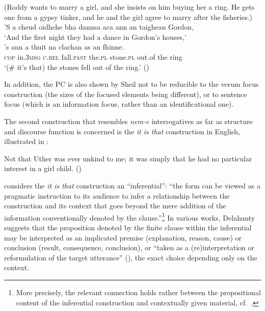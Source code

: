 \documentclass[output=paper,colorlinks,citecolor=brown]{langscibook}
\begin{document}
	
	\ea\label{ex:SG}
	(Roddy wants to marry a girl, and she insists on him buying her a ring. He gets
	one from a gypsy tinker, and he and the girl agree to marry after the fisheries.)\\
	'S a cheud oidhche bha dannsa aca ann an taighean Gordon,\\
	`And the first night they had a dance in Gordon's houses,'\\
	\gll 's ann a thuit na clachan as an fhinne.\\
	\textsc{cop} in.3\textsc{msg} \textsc{c.rel} fall.\textsc{past} 
	the.\textsc{pl}  stone.\textsc{pl} out.of the ring\\
	\glt `(\# it's that) the stones fell out of the ring.'\hspace{1.8cm} (\citealt[5, (1.6)]{sheil16})
	\z
	
	\noindent In addition, the PC is also shown by Sheil not to be reducible to  the verum focus construction (the sizes of the focused elements being different), or to sentence focus (which is an information focus, rather than an identificational one). 
		
	The second construction that resembles \textit{nem-e} interrogatives as far as structure and discourse function is concerned is the \textit{it is that} construction in English, illustrated in :
	
	\ea\label{ex:uther} Not that Uther was ever unkind to me; it was simply that he had no
	particular interest in a girl child. \hspace{3.2cm}(\citealt[11]{delahunty1990})
	\z
	
	\noindent \citet[20]{delahunty1990} considers the \textit{it is that} construction an  ``inferential'': ``the form can be viewed as a pragmatic instruction to its audience to infer a relationship between the construction and its context that goes beyond
	the mere addition of the information conventionally denoted by the clause.''\footnote{More precisely, the relevant connection holds rather between the propositional content of the inferential construction and contextually given material, cf.~\citet[48]{remberger2020}.} In various works, Delahunty suggests that the proposition denoted by the finite clause within the inferential may be interpreted as an implicated premise (explanation, reason, cause) or conclusion (result, consequence, conclusion), or ``taken as a (re)interpretation or reformulation of the target utterance'' (\citealt[301]{delahunty+gatzkiewicz}), the exact choice depending only on the context.
	
\end{document}
